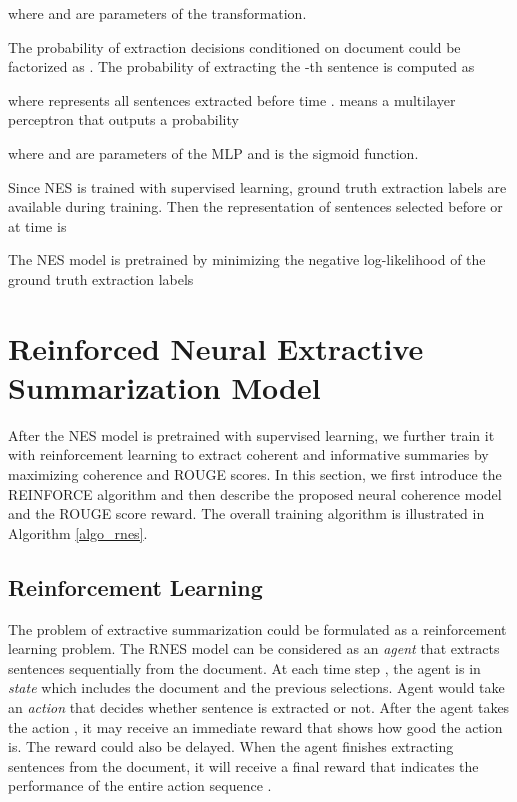 \documentclass[letterpaper]{article} \usepackage{aaai18}  \usepackage{times}  \usepackage{helvet}  \usepackage{courier}  \usepackage{url}  \usepackage{graphicx}  \usepackage{amssymb}
\begin{document}
	where  and  are parameters of the transformation. 
	
	The probability of extraction decisions  conditioned on document  could be factorized as .
	The probability of extracting the -th sentence is computed as
	
	where  represents all sentences extracted before time .  means a multilayer perceptron that outputs a probability
	
	where  and  are parameters of the MLP and  is the sigmoid function. 
	
	Since NES is trained with supervised learning, ground truth extraction labels  are available during training. Then the representation of sentences selected before or at time  is
	
	
	The NES model is pretrained by minimizing the negative log-likelihood of the ground truth extraction labels
	


	\section{Reinforced Neural Extractive Summarization Model}
	\label{sec:rl}
    After the NES model is pretrained with supervised learning, we further train it with reinforcement learning to extract coherent and informative summaries by maximizing coherence and ROUGE scores. In this section, we first introduce the REINFORCE algorithm and then describe the proposed neural coherence model and the ROUGE score reward. The overall training algorithm is illustrated in Algorithm \ref{algo_rnes}.

	\subsection{Reinforcement Learning} 

	The problem of extractive summarization could be formulated as a reinforcement learning problem. The RNES model can be considered as an \emph{agent} that extracts sentences sequentially from the document. At each time step , the agent is in \emph{state}  which includes the document and the previous selections. Agent would take an \emph{action}  that decides whether sentence  is extracted or not. After the agent takes the action , it may receive an immediate reward  that shows how good the action is. The reward could also be delayed. When the agent finishes extracting sentences from the document, it will receive a final reward  that indicates the performance of the entire action sequence .
	
\end{document}
